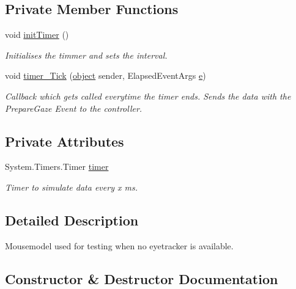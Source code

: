 \subsection*{Private Member Functions}
\begin{DoxyCompactItemize}
\item 
void \hyperlink{class_web_analyzer_1_1_test_1_1_communication_1_1_mouse_model_ab5f8535f5bfb5970dcc3b9b21fb575ff}{init\+Timer} ()
\begin{DoxyCompactList}\small\item\em Initialises the timmer and sets the interval. \end{DoxyCompactList}\item 
void \hyperlink{class_web_analyzer_1_1_test_1_1_communication_1_1_mouse_model_abc9a2acb278976c242b6210d701c4900}{timer\+\_\+\+Tick} (\hyperlink{_u_i_2_h_t_m_l_resources_2js_2lib_2underscore_8min_8js_aae18b7515bb2bc4137586506e7c0c903}{object} sender, Elapsed\+Event\+Args \hyperlink{_u_i_2_h_t_m_l_resources_2js_2lib_2bootstrap_8min_8js_ab5902775854a8b8440bcd25e0fe1c120}{e})
\begin{DoxyCompactList}\small\item\em Callback which gets called everytime the timer ends. Sends the data with the Prepare\+Gaze Event to the controller. \end{DoxyCompactList}\end{DoxyCompactItemize}
\subsection*{Private Attributes}
\begin{DoxyCompactItemize}
\item 
System.\+Timers.\+Timer \hyperlink{class_web_analyzer_1_1_test_1_1_communication_1_1_mouse_model_a59254b95befed343634d46aff30dd80b}{timer}
\begin{DoxyCompactList}\small\item\em Timer to simulate data every x ms. \end{DoxyCompactList}\end{DoxyCompactItemize}


\subsection{Detailed Description}
Mousemodel used for testing when no eyetracker is available. 



\subsection{Constructor \& Destructor Documentation}
\hypertarget{class_web_analyzer_1_1_test_1_1_communication_1_1_mouse_model_ad84f4a65000f2e03f7003546d5e63dd2}{}
